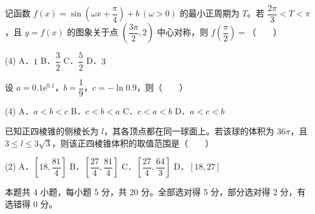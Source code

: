 \begin{question}
记函数 $f(x)=\sin\left(\omega x+\dfrac\pi4\right)+b\ (\omega>0)$ 的最小正周期为 $T$。若 $\dfrac{2\pi}3<T<\pi$，且 $y=f(x)$ 的图象关于点 $\left(\dfrac{3\pi}2,2\right)$ 中心对称，则 $f\left(\dfrac\pi2\right)=$（　　）

\begin{gkopts}(4)
\task A．$1$
\task B．$\dfrac32$
\task C．$\dfrac52$
\task D．$3$
\end{gkopts}

\end{question}
\begin{question}
设 $a=0.1\mathrm e^{0.1}$，$b=\dfrac19$，$c=-\ln0.9$，则（　　）

\begin{gkopts}(4)
\task A．$a<b<c$
\task B．$c<b<a$
\task C．$c<a<b$
\task D．$a<c<b$
\end{gkopts}

\end{question}
\begin{question}
已知正四棱锥的侧棱长为 $l$，其各顶点都在同一球面上。若该球的体积为 $36\pi$，且 $3\le l\le3\sqrt3$，则该正四棱锥体积的取值范围是（　　）

\begin{gkopts}(2)
\task A．$\left[18,\dfrac{81}4\right]$
\task B．$\left[\dfrac{27}4,\dfrac{81}4\right]$
\task C．$\left[\dfrac{27}4,\dfrac{64}3\right]$
\task D．$[18,27]$
\end{gkopts}

\par\medskip

\end{question}

\begin{gktip}
本题共 4 小题，每小题 5 分，共 20 分。全部选对得 5 分，部分选对得 2 分，有选错得 0 分。
\end{gktip}

